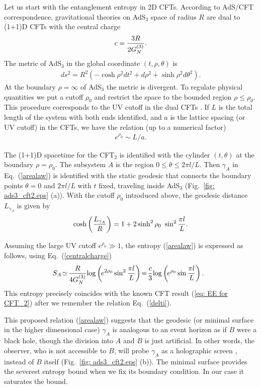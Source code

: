 \documentclass[twocolumn,amsmath,amssymb,nofootinbib,eqsecnum,tighten,prd]{revtex4}
\def\frac#1#2{{#1\over #2}}
\def\f {\frac}
\def\frac#1#2{{#1\over #2}}
\def\be{\begin{equation}}
\def\ee{\end{equation}}
\begin{document}
Let us start with the entanglement entropy in 2D CFTs.
According to AdS/CFT correspondence, gravitational theories on
AdS$_3$ space of radius $R$ are dual to (1+1)D CFTs with
the central charge  \cite{BH}
\be c=\frac{3R}{2G^{(3)}_N}. \label{centralcharge} \ee
The metric of AdS$_3$ in the
global coordinate $(t,\rho,\theta)$  is
\begin{eqnarray}
ds^2=R^2\left(-\cosh\rho^2
dt^2+d\rho^2+\sinh\rho^2d\theta^2\right). \label{ads}
\end{eqnarray}
At the boundary $\rho=\infty$ of AdS$_3$ the metric is
divergent. To regulate physical quantities we put a
cutoff $\rho_0$ and restrict the space to the bounded region
$\rho\leq\rho_0$. This procedure corresponds to
the UV cutoff in the dual CFTs \cite{SuWi}.
If $L$ is the total
length of the system with both ends identified, and $a$ is the
lattice spacing (or UV cutoff) in the CFTs,
we have the relation (up to a numerical factor)
\begin{eqnarray}
e^{\rho_0}\sim L/a. \label{cutoff}
\label{delti}
\end{eqnarray}

The (1+1)D spacetime for the CFT$_2$ is identified with the cylinder
$(t,\theta)$ at the boundary $\rho=\rho_0$. The subsystem $A$ is the
region $0\leq \theta\leq 2\pi l/L$. Then $\gamma_A$ in  Eq.\
(\ref{arealaw}) is identified with the static geodesic
 that connects the boundary points
$\theta=0$ and $2\pi l/L$ with $t$ fixed,
traveling inside AdS$_3$
(Fig.\ \ref{fig: ads3_cft2.eps} (a)).
With the cutoff $\rho_0$ introduced above,
the geodesic distance $L_{\gamma_A}$
is given by
\begin{eqnarray}
\cosh\left(\f{L_{\gamma_A}}{R}\right)=1+2\sinh^2\rho_0~\sin^2\frac{\pi l}{L}.
\label{geodesic}
\end{eqnarray}

Assuming the large UV cutoff  $e^{\rho_0}\gg 1$,
the entropy (\ref{arealaw}) is expressed as follows, using Eq.\ (\ref{centralcharge})
\begin{eqnarray}
S_A
\!\simeq\!
\frac{R}{4G^{(3)}_N}\!\log\left(\!e^{2\rho_0}\sin^2\frac{\pi l}{L}\right)
\! =\!
\frac{c}{3}\!\log\left(\!e^{\rho_0}\sin\frac{\pi l}{L}\right).~~
\end{eqnarray}
This entropy precisely coincides with the known CFT result
(\ref{eq: EE for CFT_2})
after we remember the relation Eq.\ (\ref{delti}).

This proposed relation (\ref{arealaw}) suggests that the geodesic
 (or minimal surface in the higher dimensional case)
 $\gamma_A$ is analogous to an event
 horizon as if $B$ were a black hole, though
 the division into $A$ and $B$ is just artificial. In other
words, the observer, who is not accessible to $B$, will probe
$\gamma_A$ as a holographic screen \cite{holography}, instead of $B$
itself (Fig.\ \ref{fig: ads3_cft2.eps} (b)). The minimal surface
provides the severest entropy bound when we fix its boundary
condition. In our case it saturates the bound.
\end{document}
